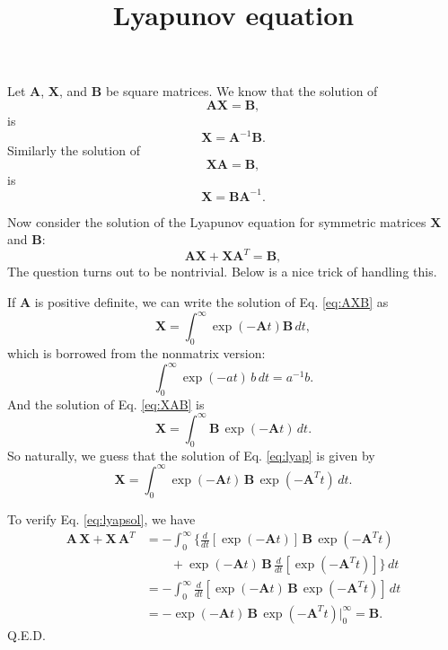 \documentclass{article}
\begin{document}
\title{Lyapunov equation}
\author{ \vspace{-10ex} }
\date{ \vspace{-10ex} }
\maketitle

Let $\mathbf A$, $\mathbf X$, and $\mathbf B$ be square matrices.
We know that the solution of
\begin{equation}
\mathbf A \mathbf X = \mathbf B,
\label{eq:AXB}
\end{equation}
is
$$
\mathbf X = \mathbf A^{-1} \mathbf B.
$$
Similarly the solution of
\begin{equation}
\mathbf X \mathbf A = \mathbf B,
\label{eq:XAB}
\end{equation}
is
$$
\mathbf X = \mathbf B \mathbf A^{-1}.
$$

Now consider the solution of the Lyapunov equation
for symmetric matrices $\mathbf X$ and $\mathbf B$:
\begin{equation}
\mathbf A \mathbf X + \mathbf X \mathbf A^T = \mathbf B,
\label{eq:lyap}
\end{equation}
The question turns out to be nontrivial.
Below is a nice trick of handling this.

If $\mathbf A$ is positive definite,
we can write the solution of Eq. \eqref{eq:AXB} as
$$
\mathbf X = \int_0^\infty \exp(-\mathbf A t) \mathbf B \, dt,
$$
which is borrowed from the nonmatrix version:
$$
\int_0^\infty \exp(-at) \, b \, dt  = a^{-1} b.
$$
And the solution of Eq. \eqref{eq:XAB} is
$$
\mathbf X = \int_0^\infty \mathbf B \, \exp(-\mathbf A t) \, dt.
$$
So naturally, we guess that the solution of Eq. \eqref{eq:lyap} is
given by
\begin{equation}
\mathbf X =
\int_0^\infty
\exp(-\mathbf A t) \, \mathbf B \, \exp(-\mathbf A^T t) \, dt.
\label{eq:lyapsol}
\end{equation}

To verify Eq. \eqref{eq:lyapsol},
we have
$$
\begin{aligned}
\mathbf A \, \mathbf X + \mathbf X \, \mathbf A^T
&=
-\int_0^\infty
\Big\{
\frac{d}{dt}[ \exp(-\mathbf A t) ] \, \mathbf B \, \exp(-\mathbf A^T t)
\\
&\qquad +
\exp(-\mathbf A t) \, \mathbf B \, \frac{d}{dt}[\exp(-\mathbf A^T t) ]
\Big\}
 \, dt \\
&=
-\int_0^\infty
\frac{d}{dt}[ \exp(-\mathbf A t) \, \mathbf B \, \exp(-\mathbf A^T t) ]
 \, dt \\
&=
-\exp(-\mathbf A t) \, \mathbf B \, \exp(-\mathbf A^T t) \Big|_0^\infty
= \mathbf B.
\end{aligned}
$$
Q.E.D.
\end{document}

